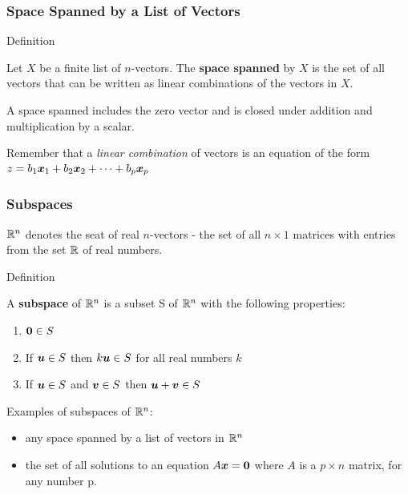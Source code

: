 \documentclass{beamer}
\begin{document}
\begin{frame}
  \frametitle{Space Spanned by a List of Vectors}


\begin{block}{Definition}

Let $X$ be a finite list of $n$-vectors. The \textbf{space spanned} by $X$ is the set of all vectors that can be written as linear combinations of the vectors in $X$.
\medskip

A space spanned includes the zero vector and is closed under addition and multiplication by a scalar.

\end{block}
\bigskip

Remember that a \emph{linear combination} of vectors is an equation of the form $z = b_1 \bm{x}_1 + b_2 \bm{x}_2 + \cdots + b_p \bm{x}_p$

\end{frame}



\begin{frame}
  \frametitle{Subspaces}

$\mathbb{R}^n$  denotes the seat of real $n$-vectors - the set of all $n \times 1$ matrices with entries from the set $\mathbb{R}$ of real numbers.
\medskip

\begin{block}{Definition}

A \textbf{subspace} of $\mathbb{R}^n$ is a subset S of $\mathbb{R}^n$ with the following properties:
\begin{enumerate}
    \item $\bm{0} \in S$
    \item If $\bm{u} \in S$ then $k\bm{u} \in S$ for all real numbers $k$
    \item If $\bm{u} \in S$ and  $\bm{v} \in S$ then $\bm{u} + \bm{v} \in S$
\end{enumerate}

\end{block}

Examples of subspaces of $\mathbb{R}^n$:
\begin{itemize}
    \item any space spanned by a list of vectors in $\mathbb{R}^n$
    \item the set of all solutions to an equation $A\bm{x} = \bm{0}$ where $A$ is a $p \times n$ matrix, for any number p.
\end{itemize}

\end{frame}
\end{document}

